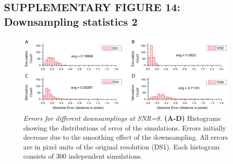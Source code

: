 \documentclass[]{spie}  %
\begin{document}
\subsection*{SUPPLEMENTARY FIGURE 14: Downsampling statistics 2}
\vspace{1mm}
\begin{figure}[h!]
\includegraphics[width=\textwidth]{fig-downsampling-statistics-1.png}
\vspace{-2.0mm}
\caption{\hspace{-0.5mm} \emph{Errors for different downsamplings at SNR=8.} \textbf{(A-D)} Histograms showing the distributions of error of the simulations. Errors initially decrease due to the smoothing effect of the downsampling. All errors are in pixel units of the original resolution (DS1). Each histogram consists of 300 independent simulations.
}
\label{fig:sup-fig-downsampling-statistics-1}
\end{figure}

\pagebreak
\end{document}
